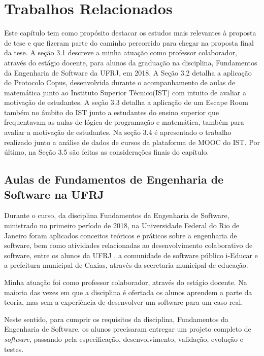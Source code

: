 \chapter{Trabalhos Relacionados}

Este capítulo tem como propósito destacar os estudos mais relevantes à proposta de tese e que fizeram parte do caminho percorrido para chegar na proposta final da tese.  A seção 3.1 descreve a minha atuação como professor colaborador, através do estágio docente, para alunos da graduação na disciplina, Fundamentos da Engenharia de Software da UFRJ, em 2018.  A Seção 3.2 detalha a aplicação do Protocolo Copus, desenvolvida durante o acompanhamento de aulas de matemática junto ao Instituto Superior Técnico(IST) com intuito de avaliar a motivação de estudantes. A seção 3.3 detalha a aplicação de um Escape Room também no âmbito do IST junto a estudantes do ensino superior que frequentavam as aulas de lógica de programação e matemática, também para avaliar a motivação de estudantes.  Na seção 3.4 é apresentado o trabalho realizado junto a análise de dados de cursos da plataforma de MOOC do IST.  Por último, na Seção 3.5 são feitas as considerações finais do capítulo.

\section{Aulas de Fundamentos de Engenharia de Software na UFRJ}

Durante o curso, da disciplina Fundamentos da Engenharia de Software, ministrado no primeiro período de 2018, na Universidade Federal do Rio de Janeiro foram aplicados conceitos teóricos e práticos sobre a engenharia de software, bem como atividades relacionadas ao desenvolvimento colaborativo de software, entre os alunos da UFRJ \citep{github_fes-ufrj_2018}, a comunidade de software público i-Educar \citep{portal_i-educar_2009} e a prefeitura municipal de Caxias, através da secretaria municipal de educação.

Minha atuação foi como professor colaborador, através do estágio docente. Na maioria das vezes em que a disciplina é ofertada os alunos aprendem a parte da teoria, mas sem a experiência de desenvolver um software para um caso real.

Neste sentido, para cumprir os requisitos da disciplina, Fundamentos da Engenharia de Software, os alunos precisaram entregar um projeto completo de \textit{software}, passando pela especificação, desenvolvimento, validação, evolução e testes.  

